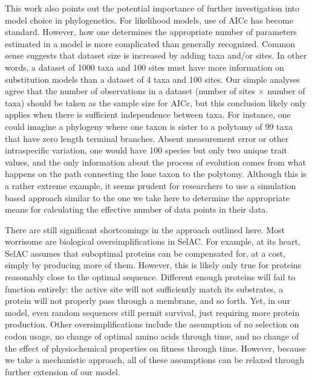 \documentclass[12pt,letterpaper,fleqn]{article}
\newcommand{\selac}{SelAC\xspace}
\begin{document}
This work also points out the potential importance of further investigation into model choice in phylogenetics.
For likelihood models, use of AICc has become standard.
However, how one determines the appropriate number of parameters estimated in a model is more complicated than generally recognized.
Common sense suggests that dataset size is increased by adding taxa and/or sites.
In other words, a dataset of 1000 taxa and 100 sites must have more information on substitution models than a dataset of 4 taxa and 100 sites.
Our simple analyses agree that the number of observations in a dataset (number of sites $\times$ number of taxa) should be taken as the sample size for AICc, but this conclusion likely only applies when there is sufficient independence between taxa.
For instance, one could imagine a phylogeny where one taxon is sister to a polytomy of 99 taxa that have zero length terminal branches.
Absent measurement error or other intraspecific variation, one would have 100 species but only two unique trait values, and the only information about the process of evolution comes from what happens on the path connecting the lone taxon to the polytomy.
Although this is a rather extreme example, it seems prudent for researchers to use a simulation based approach similar to the one we take here to determine the appropriate means for calculating the effective number of data points in their data.

There are still significant shortcomings in the approach outlined here.
Most worrisome are biological oversimplifications in \selac.
For example, at its heart, \selac assumes that suboptimal proteins can be compensated for, at a cost, simply by producing more of them.
However, this is likely only true for proteins reasonably close to the optimal sequence.
Different enough proteins will fail to function entirely: the active site will not sufficiently match its substrates, a protein will not properly pass through a membrane, and so forth.
Yet, in our model, even random sequences still permit survival, just requiring more protein production.
Other oversimplifications include the assumption of no selection on codon usage, no change of optimal amino acids through time, and no change of the effect of physiochemical properties on fitness through time.
However, because we take a mechanistic approach, all of these assumptions can be relaxed through further extension of our model.
\end{document}
